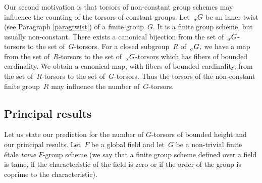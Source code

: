 \documentclass[a4paper,english,12pt]{amsart}
\newcommand{\QQ}{\mathbb{Q}}
\newcommand{\ZZ}{\mathbb{Z}}
\newcommand{\Akk}{\mathfrak A_4}
\newcommand{\sG}{\prescript{}{\sigma}G}
\numberwithin{equation}{subsection}
\begin{document}
\subsubsection{} Our second motivation is that torsors of non-constant group schemes may influence the counting of the torsors of constant groups.  Let~$\sG$ be an inner twist (see Paragraph \ref{paragtwist}) of a finite group~$G$. It is a finite group scheme, but usually non-constant. There exists a canonical bijection from the set of~$\sG$-torsors to the set of~$G$-torsors. For a closed subgroup~$R$ of~$\sG,$ we have a map from the set of~$R$-torsors to the set of~$\sG$-torsors which has fibers of bounded cardinality. We obtain a canonical map, with fibers of bounded cardinality, from the set of~$R$-torsors to the set of~$G$-torsors. Thus the torsors of the non-constant finite group~$R$ may influence the number of~$G$-torsors. %
%
\subsection{Principal results}
Let us state our prediction for the number of $G$-torsors of bounded height and our principal results. Let~$F$ be a global field and let~$G$ be a non-trivial finite \' etale {\it tame} $F$-group scheme (we say that a finite group scheme defined over a field is tame, if the characteristic of the field is zero or if the order of the group is coprime to the characteristic). %
\end{document}
